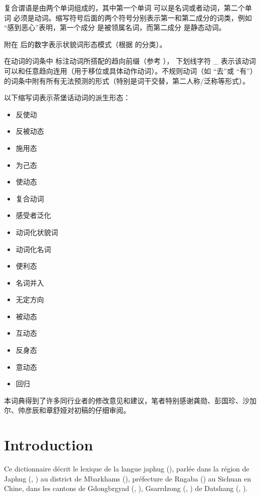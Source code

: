 复合谓语是由两个单词组成的，其中第一个单词  可以是名词或者动词，第二个单词 必须是动词。缩写符号后面的两个符号分别表示第一和第二成分的词类，例如   “感到恶心”表明，第一个成分  是被领属名词，而第二成分 是静态动词。

附在  后的数字表示状貌词形态模式（根据 \citealt{japhug14ideophones}的分类）。

在动词的词条中  标注动词所搭配的趋向前缀（参考 \citealt[267-9]{jacques14linking}）， 下划线字符 \_ 表示该动词可以和任意趋向连用（用于移位或具体动作动词）。不规则动词（如  “去”或    “有”）的词条中附有所有无法预测的形式（特别是词干交替，第二人称/泛称等形式）。

 以下缩写词表示茶堡话动词的派生形态：

\begin{itemize}
\item {} 反使动 
\item {} 反被动态
\item {} 施用态
\item {} 为己态
\item {} 使动态
\item {} 复合动词
\item {} 感受者泛化
\item {} 动词化状貌词
\item {} 动词化名词
\item {} 便利态
\item {} 名词并入
\item {} 无定方向
\item {} 被动态
\item {} 互动态
\item {} 反身态
\item {} 意动态
\item {} 回归
\end{itemize}

本词典得到了许多同行业者的修改意见和建议，笔者特别感谢龚勋、彭国珍、沙加尔、帅彦辰和章舒娅对初稿的仔细审阅。
\newpage
\normalfont
\section*{Introduction}

Ce  dictionnaire décrit le lexique de la langue japhug (), parlée dans la région de Japhug (, ) au district de Mbarkhams (), préfecture de Rngaba () au Sichuan en Chine, dans les cantons de Gdongbrgyad (, ), Gsarrdzong (,   ) de Datshang (, ).  

